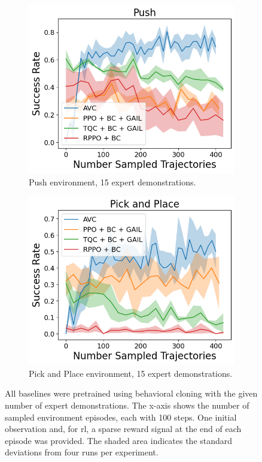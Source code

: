 \begin{figure}[htbp]
  \medskip
  \begin{subfigure}[t]{0.45\textwidth}
    \includegraphics[width=\textwidth]{images/15_400/Push.png}
    \caption{Push environment, 15 expert demonstrations.}
  \end{subfigure}
  \begin{subfigure}[t]{0.45\textwidth}
    \includegraphics[width=\textwidth]{images/15_400/Pick and Place.png}
    \caption{Pick and Place environment, 15 expert demonstrations.}
  \end{subfigure}
  \caption{
    All baselines were pretrained using behavioral cloning with the given number of expert demonstrations. 
    The x-axis shows the number of sampled environment episodes, each with 100 steps. 
    One initial observation and, for \ac{rl}, a sparse reward signal at the end of each episode was provided. 
    The shaded area indicates the standard deviations from four runs per experiment.}
    \label{fig:finetuning}
\end{figure}

